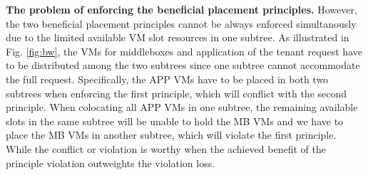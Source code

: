 \documentclass[review]{elsarticle}
\begin{document}
\textbf{The problem of enforcing the beneficial placement principles.} However, the two beneficial placement principles cannot be always enforced simultanously due to the limited available VM slot resources in one subtree. As illustrated in Fig. \ref{fig:bw}, the VMs for middleboxes and application of the tenant request have to be distributed among the two subtrees since one subtree cannot accommodate the full request. Specifically, the APP VMs have to be placed in both two subtrees when enforcing the first principle, which will conflict with the second principle. When colocating all APP VMs in one subtree, the remaining available slots in the same subtree will be unable to hold the MB VMs and we have to place the MB VMs in another subtree, which will violate the first principle. While the conflict or violation is worthy when the achieved benefit of the principle violation outweights the violation loss.
\end{document}
